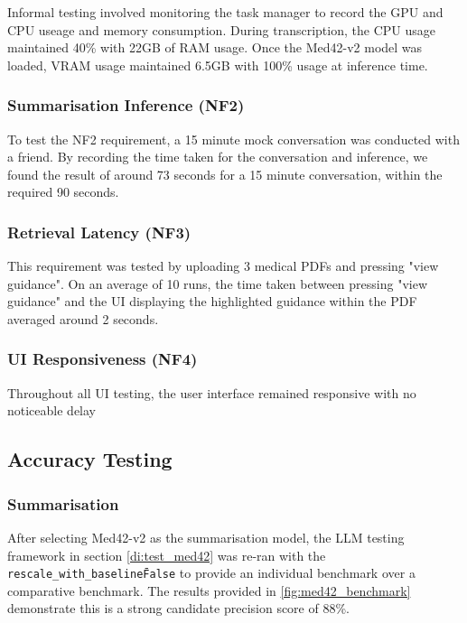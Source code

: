 Informal testing involved monitoring the task manager to record the GPU and CPU useage and memory consumption. During transcription, the CPU usage maintained 40\% with 22GB of RAM usage. Once the Med42-v2 model was loaded, VRAM usage maintained 6.5GB with 100\% usage at inference time.


\subsubsection{Summarisation Inference (NF2)}
To test the NF2 requirement, a 15 minute mock conversation was conducted with a friend. By recording the time taken for the conversation and inference, we found the result of around 73 seconds for a 15 minute conversation, within the required 90 seconds.

\subsubsection{Retrieval Latency (NF3)}
This requirement was tested by uploading 3 medical PDFs and pressing "view guidance". On an average of 10 runs, the time taken between pressing "view guidance" and the UI displaying the highlighted guidance within the PDF averaged around 2 seconds.

\subsubsection{UI Responsiveness (NF4)}
Throughout all UI testing, the user interface remained responsive with no noticeable delay

\subsection{Accuracy Testing}
\subsubsection{Summarisation}
After selecting Med42-v2 as the summarisation model, the LLM testing framework in section \ref{di:test_med42} was re-ran with the \texttt{rescale\_with\_baseline\=False} to provide an individual benchmark over a comparative benchmark. The results provided in \ref{fig:med42_benchmark} demonstrate this is a strong candidate precision score of 88\%.

